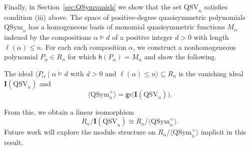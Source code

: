 \documentclass[12pt]{amsart}
\newcommand{\Lucas}[1]{\todo[size=\tiny,inline,color=green!5!red!30!yellow!80]{#1 \\ \hfill --- Lucas}}
\theoremstyle{definition}
\theoremstyle{remark}
\numberwithin{equation}{section}
\newenvironment{introthm}[1]{
  \renewcommand\theequation{#1}
  \thm
}{\endthm}
\newcommand{\QSym}{\mathrm{QSym}}
\newcommand{\QSV}{\mathrm{QSV}}
\begin{document}
Finally, in Section~\ref{sec:QSymvanish} we show that the set $\QSV_{n}$ satisfies condition (iii) above.  
The space of positive-degree quasisymmetric polynomials $\QSym_{n}$ has a homogeneous basis of monomial quasisymmetric functions $M_{\alpha}$ indexed by the compositions $\alpha \vDash d$ of a positive integer $d > 0$ with length $\ell(\alpha) \le n$.  
For each such composition $\alpha$, we construct a nonhomogeneous polynomial $P_{\alpha} \in R_{n}$ for which $\mathsf{h}(P_{\alpha}) = M_{\alpha}$ and show the following.

\begin{introthm}{\ref{thm:vanishingQSV}}
The ideal $\langle P_{\alpha} \;|\; \text{$\alpha \vDash d $ with $d> 0$ and $\ell(\alpha) \le n$} \rangle \subseteq R_n$ is the vanishing ideal $\mathbf{I}(\QSV_n)$ and 
\[
 \langle \QSym_{n}^{+} \rangle = \mathsf{gr}\big(\mathbf{I}(\QSV_{n})\big).
\]
\end{introthm}

From this, we obtain a linear isomorphism
\[
R_{n}/\mathbf{I}(\QSV_{n}) \cong R_{n}/\langle \QSym_{n}^{+} \rangle.
\]
Future work will explore the module structure on $R_{n}/\langle \QSym_{n}^{+} \rangle$ implicit in this result.


\Lucas{I am here}
\end{document}
